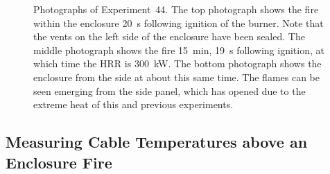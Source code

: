 \begin{figure}[p]
\caption[Photographs of Experiment~44]{Photographs of Experiment~44. The top photograph shows the fire within the enclosure 20~s following ignition of the burner. Note that the vents on the left side of the enclosure have been sealed. The middle photograph shows the fire 15~min, 19~s following ignition, at which time the HRR is 300~kW. The bottom photograph shows the enclosure from the side at about this same time. The flames can be seen emerging from the side panel, which has opened due to the extreme heat of this and previous experiments.}
\label{fig:Test_44_photos}
\end{figure}


\clearpage


\subsection{Measuring Cable Temperatures above an Enclosure Fire}

